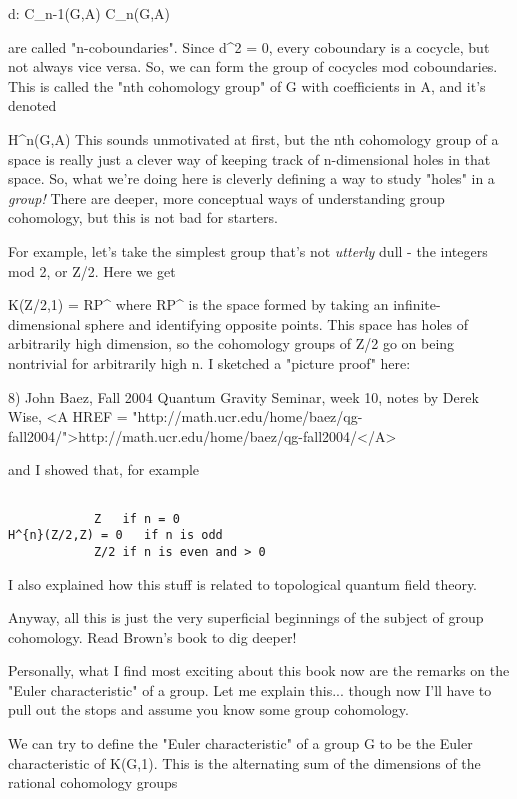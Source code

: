 d: C_{n-1}(G,A) \to  C_{n}(G,A)

are called "n-coboundaries".   Since d^{2} 
= 0, every coboundary is
a cocycle, but not always vice versa.  So, we can form the group of
cocycles mod coboundaries.  This is called the "nth cohomology
group" of G with coefficients in A, and it's denoted

H^{n}(G,A)
This sounds unmotivated at first, but the nth cohomology group of a
space is really just a clever way of keeping track of n-dimensional 
holes in that space.  So, what we're doing here is cleverly defining
a way to study "holes" in a \emph{group!}  
There are deeper, more conceptual
ways of understanding group cohomology, but this is not bad for starters.

For example, let's take the simplest group that's not \emph{utterly} dull -
the integers mod 2, or Z/2.  Here we get 

K(Z/2,1) = RP^{\infty }
where RP^{\infty } 
is the space formed by taking an infinite-dimensional
sphere and identifying opposite points.  This space has holes of 
arbitrarily high dimension, so the cohomology groups of Z/2 go on being 
nontrivial for arbitrarily high n.  I sketched a "picture proof" here:

8) John Baez, Fall 2004 Quantum Gravity Seminar, week 10, notes
by Derek Wise, <A HREF = "http://math.ucr.edu/home/baez/qg-fall2004/">http://math.ucr.edu/home/baez/qg-fall2004/</A>

and I showed that, for example


\begin{verbatim}

            Z   if n = 0
H^{n}(Z/2,Z) = 0   if n is odd
            Z/2 if n is even and > 0
\end{verbatim}
    
I also explained how this stuff is related to topological quantum field
theory.

Anyway, all this is just the very superficial beginnings of the subject
of group cohomology.  Read Brown's book to dig deeper!

Personally, what I find most exciting about this book now are the
remarks on the "Euler characteristic" of a group.  Let me 
explain this...
though now I'll have to pull out the stops and assume you know some
group cohomology.

We can try to define the "Euler characteristic" of a group G to be the 
Euler characteristic of K(G,1).  This is the alternating sum of the 
dimensions of the rational cohomology groups


